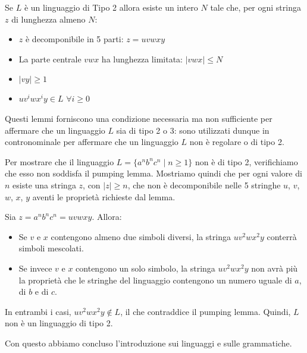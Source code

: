 \documentclass{article}
\begin{document}
\begin{lemma}
Se \( L \) è un linguaggio di Tipo 2 allora esiste un intero \( N \) tale che, per ogni stringa \( z \) di lunghezza almeno \( N \):

\begin{itemize}
    \item \( z \) è decomponibile in 5 parti: \( z = uvwxy \)
    \item La parte centrale \( vwx \) ha lunghezza limitata: \( |vwx| \leq N \)
    \item \( |vy| \geq 1 \)
    \item \( uv^i wx^i y \in L \) \(\forall i \geq 0\)
\end{itemize}
\end{lemma}

Questi lemmi forniscono una condizione necessaria ma non sufficiente per affermare che un linguaggio \( L \) sia di tipo 2 o 3: sono utilizzati dunque in contronominale per affermare che un linguaggio \( L \) non è regolare o di tipo 2.

\begin{example}
\noindent
Per mostrare che il linguaggio $L = \{a^nb^nc^n \mid n \geq 1\}$ non è di tipo 2, verifichiamo che esso non soddisfa il pumping lemma. Mostriamo quindi che per ogni valore di $n$ esiste una stringa $z$, con $|z| \geq n$, che non è decomponibile nelle 5 stringhe $u$, $v$, $w$, $x$, $y$ aventi le proprietà richieste dal lemma.

Sia $z = a^nb^nc^n = uvwxy$. Allora:

\begin{itemize}
    \item Se $v$ e $x$ contengono almeno due simboli diversi, la stringa $uv^2wx^2y$ conterrà simboli mescolati.
    \item Se invece $v$ e $x$ contengono un solo simbolo, la stringa $uv^2wx^2y$ non avrà più la proprietà che le stringhe del linguaggio contengono un numero uguale di $a$, di $b$ e di $c$.
\end{itemize}

In entrambi i casi, $uv^2wx^2y \notin L$, il che contraddice il pumping lemma. Quindi, $L$ non è un linguaggio di tipo 2.
\end{example}
\noindent
Con questo abbiamo concluso l'introduzione sui linguaggi e sulle grammatiche.\\
\end{document}

